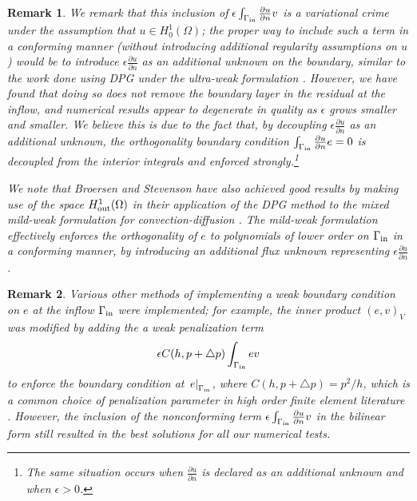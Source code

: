 \documentclass[final,leqno]{siamltex}
\newcommand{\LRp}[1]{\left( #1 \right)}
\newcommand{\pd}[2]{\frac{\partial#1}{\partial#2}}
\newtheorem{remark}{Remark}
\begin{document}
\begin{remark}
We remark that this inclusion of $\epsilon\int_{\Gamma_{\rm in}} \pd{u}{n}v$ is a variational crime under the assumption that $u \in H^1_0(\Omega)$; the proper way to include such a term in a conforming manner (without introducing additional regularity assumptions on $u$) would be to introduce $\epsilon \pd{u}{n}$ as an additional unknown on the boundary, similar to the work done using DPG under the ultra-weak formulation \cite{DPG2,analysisDPG}.  However, we have found that doing so does not remove the boundary layer in the residual at the inflow, and numerical results appear to degenerate in quality as $\epsilon$ grows smaller and smaller.  We believe this is due to the fact that, by decoupling $\epsilon \pd{u}{n}$ as an additional unknown, the orthogonality boundary condition $\int_{\Gamma_{\rm in}} \pd{u}{n} e = 0$ is decoupled from the interior integrals and enforced strongly.\footnote{The same situation occurs when $\pd{u}{n}$ is declared as an additional unknown and when $\epsilon > 0$.}

We note that Broersen and Stevenson have also achieved good results by making use of the space $H^1_{\rm out}(\Omega)$ in their application of the DPG method to the mixed mild-weak formulation for convection-diffusion \cite{broersenStevenson}.  The mild-weak formulation effectively enforces the orthogonality of $e$ to polynomials of lower order on $\Gamma_{\rm in}$ in a conforming manner, by introducing an additional flux unknown representing $\epsilon \pd{u}{n}$.  

\end{remark}
\begin{remark}
Various other methods of implementing a weak boundary condition on $e$ at the inflow $\Gamma_{\rm in}$ were implemented; for example, the inner product $\LRp{e,v}_V$ was modified by adding the a weak penalization term $$\epsilon C(h,p+\triangle p)\int_{\Gamma_{\rm in}}ev $$ to enforce the boundary condition at $\left.e\right |_{\Gamma_{\rm in}}$, where $C(h,p+\triangle p) = p^2/h$, which is a common choice of penalization parameter in high order finite element literature \cite{nurbsTrace,Warburton20032765}. However, the inclusion of the nonconforming term $\epsilon\int_{\Gamma_{\rm in}} \pd{u}{n}v$ in the bilinear form still resulted in the best solutions for all our numerical tests.  
\end{remark}
\end{document}
